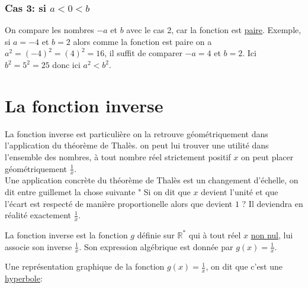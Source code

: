 \documentclass[french]{book}
\begin{document}
\subsubsection*{Cas 3: si $a<0<b$}
On compare les nombres $-a$ et $b$ avec le cas 2, car la fonction est \underline{paire}. Exemple, si $a=-4$ et $b=2$ alors comme la fonction est paire on a $a^2=(-4)^2=(4)^2=16$, il suffit de comparer $-a=4$ et $b=2$. Ici $b^2=5^2=25$ donc ici $a^2 < b^2$.

\section{La fonction inverse}

La fonction inverse est particulière on la retrouve géométriquement dans l'application du théorème de Thalès. on peut lui trouver une utilité dans l'ensemble des nombres, à tout nombre réel strictement positif $x$ on peut placer géométriquement $\frac{1}{x}$. \\

Une application concrète du théorème de Thalès est un changement d'échelle, on dit entre guillemet la chose suivante " Si on dit que $x$ devient l'unité et que l'écart est respecté de manière proportionelle alors que devient $1$ ? Il deviendra en réalité exactement $\frac{1}{x}$.

\begin{defn}
La fonction inverse est la fonction $g$ définie sur $\mathbb{R}^*$ qui à tout réel $x$ \underline{non nul}, lui associe son inverse $\frac{1}{x}$. Son expression algébrique est donnée par $g(x)=\frac{1}{x}$.
\end{defn}



Une représentation graphique de la fonction $g(x)=\frac{1}{x}$, on dit que c'est une \underline{hyperbole}:

\begin{center}



\end{center}
\end{document}

